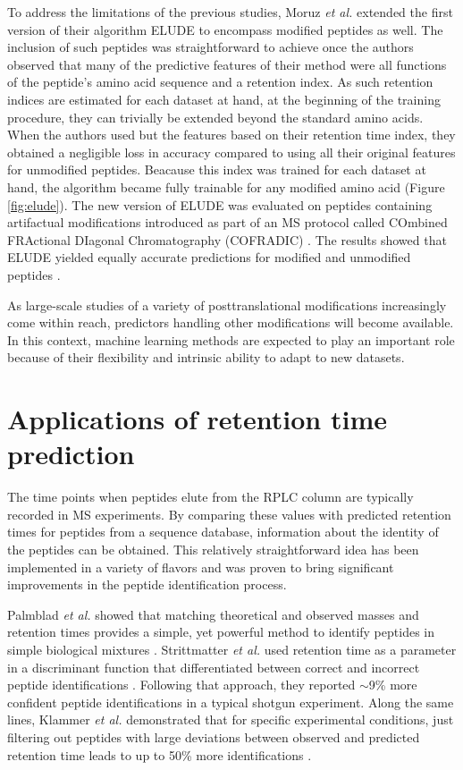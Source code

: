 \documentclass[a4paper]{article}
\begin{document}
To address the limitations of the previous studies, Moruz {\em et al.}
\cite{elude2} extended the first version of their algorithm {\sc
  ELUDE} to encompass modified peptides as well. The inclusion of such
peptides was straightforward to achieve once the authors observed that
many of the predictive features of their method were all functions of
the peptide's amino acid sequence and a retention index. As such
retention indices are estimated for each dataset at hand, at the
beginning of the training procedure, they can trivially be extended
beyond the standard amino acids. When the authors used but the
features based on their retention time index, they obtained a
negligible loss in accuracy compared to using all their original
features for unmodified peptides. Beacause this index was trained for
each dataset at hand, the algorithm became fully trainable for any
modified amino acid (Figure \ref{fig:elude}). The new version of {\sc
  ELUDE} was evaluated on peptides containing artifactual
modifications introduced as part of an MS protocol called COmbined
FRActional DIagonal Chromatography (COFRADIC) \cite{Gevaert2002}. The
results showed that {\sc ELUDE} yielded equally accurate predictions
for modified and unmodified peptides \cite{elude2}.

As large-scale studies of a variety of posttranslational modifications
increasingly come within reach, predictors
handling other modifications will become available. In this context,
machine learning methods are expected to play an important role
because of their flexibility and intrinsic ability to adapt to new
datasets.


\section{\label{sec:app}Applications of retention time prediction}

The time points when peptides elute from the RPLC column are typically
recorded in MS experiments. By comparing these values with predicted
retention times for peptides from a sequence database, information
about the identity of the peptides can be obtained. This relatively
straightforward idea has been implemented in a variety of flavors and
was proven to bring significant improvements in the peptide
identification process.


Palmblad {\em et al.} showed that matching theoretical and observed
masses and retention times provides a simple, yet powerful method to
identify peptides in simple biological mixtures
\cite{palmblad2002prediction}. Strittmatter {\em et al.} used
retention time as a parameter in a discriminant function that
differentiated between correct and incorrect peptide identifications
\cite{Strittmatter2004}. Following that approach, they reported
$\sim$9\% more confident peptide identifications in a typical shotgun
experiment. Along the same lines, Klammer {\em et al.} demonstrated
that for specific experimental conditions, just filtering out peptides
with large deviations between observed and predicted retention time
leads to up to 50\% more identifications \cite{klammer2007improving}. 
\end{document}
